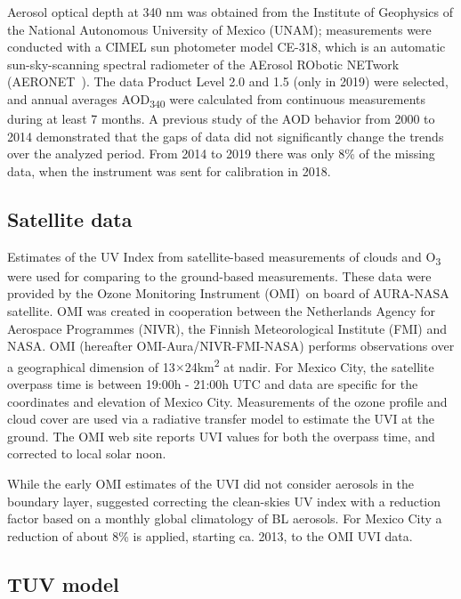 \documentclass[journal=jacsat,manuscript=article]{achemso}
\begin{document}
Aerosol optical depth at 340 nm was obtained from the Institute of
Geophysics of the National Autonomous University of Mexico (UNAM);
measurements were conducted with a CIMEL sun photometer model CE-318,
which is an automatic sun-sky-scanning spectral radiometer of
the AErosol RObotic NETwork (AERONET~\citep{Holben_1998}). The data
Product Level 2.0 and 1.5 (only in 2019) were selected, and annual
averages AOD\textsubscript{340} were calculated from continuous
measurements during at least 7 months. A previous study of the AOD
behavior from 2000 to 2014 demonstrated that the gaps of data did not
significantly change the trends over the analyzed
period.\citep{Carabali_2017} From 2014 to 2019 there was only 8\% of the
missing data, when the instrument was sent for calibration in 2018.


\subsection{Satellite data}

Estimates of the UV Index from satellite-based measurements of clouds
and O\textsubscript{3} were used for comparing to the ground-based
measurements. These data were provided by the Ozone Monitoring
Instrument (OMI)~on board of AURA-NASA satellite.\citep{dcio} OMI
was created in cooperation between the Netherlands Agency for Aerospace
Programmes (NIVR), the Finnish Meteorological Institute (FMI) and NASA.
OMI (hereafter OMI-Aura/NIVR-FMI-NASA) performs observations over a
geographical dimension of 13$\times$24km\textsuperscript{2} at nadir. For
Mexico City, the satellite overpass time is between 19:00h - 21:00h UTC
and data are specific for the coordinates and elevation of Mexico City.
Measurements of the ozone profile and cloud cover are used via a
radiative transfer model to estimate the UVI at the ground. The OMI web
site reports UVI values for both the overpass time, and corrected to
local solar noon.

While the early OMI estimates of the UVI did not consider aerosols in
the boundary layer, \citet{Arola_2009} suggested correcting
the clean-skies UV index with a reduction factor based on a monthly
global climatology of BL aerosols. For Mexico City a reduction of about
8\% is applied, starting ca. 2013, to the OMI UVI data.


\subsection{TUV model}
\end{document}
